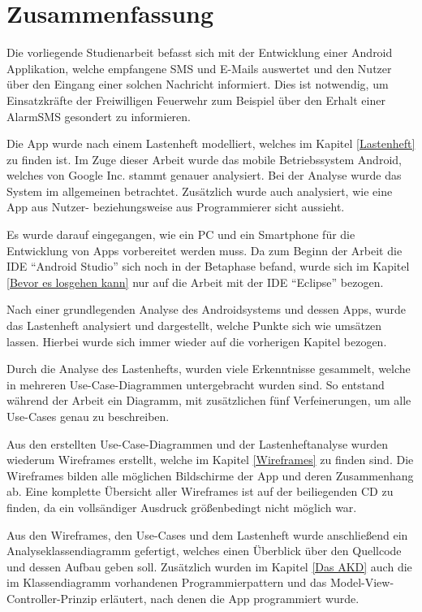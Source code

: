 \section{Zusammenfassung}
Die vorliegende Studienarbeit befasst sich mit der Entwicklung einer Android Applikation, welche empfangene SMS und E-Mails auswertet und den Nutzer \"uber den Eingang einer solchen Nachricht informiert. Dies ist notwendig, um Einsatzkr\"afte der Freiwilligen Feuerwehr zum Beispiel \"uber den Erhalt einer AlarmSMS gesondert zu informieren.

Die App wurde nach einem Lastenheft modelliert, welches im Kapitel \ref{Lastenheft} zu finden ist. Im Zuge dieser Arbeit wurde das mobile Betriebssystem Android, welches von Google Inc. stammt genauer analysiert. Bei der Analyse wurde das System im allgemeinen betrachtet. Zus\"atzlich wurde auch analysiert, wie eine App aus Nutzer- beziehungsweise aus Programmierer sicht aussieht. 

Es wurde darauf eingegangen, wie ein PC und ein Smartphone f\"ur die Entwicklung von Apps vorbereitet werden muss. Da zum Beginn der Arbeit die \ac{IDE} "`Android Studio"' sich noch in der Betaphase befand, wurde sich im Kapitel \ref{Bevor es losgehen kann} nur auf die Arbeit mit der \ac{IDE} "`Eclipse"' bezogen. 

Nach einer grundlegenden Analyse des Androidsystems und dessen Apps, wurde das Lastenheft analysiert und dargestellt, welche Punkte sich wie ums\"atzen lassen. Hierbei wurde sich immer wieder auf die vorherigen Kapitel bezogen.

Durch die Analyse des Lastenhefts, wurden viele Erkenntnisse gesammelt, welche in mehreren Use-Case-Diagrammen untergebracht wurden sind. So entstand w\"ahrend der Arbeit ein Diagramm, mit zus\"atzlichen f\"unf Verfeinerungen, um alle Use-Cases genau zu beschreiben.

Aus den erstellten Use-Case-Diagrammen und der Lastenheftanalyse wurden wiederum Wireframes erstellt, welche im Kapitel \ref{Wireframes} zu finden sind. Die Wireframes bilden alle m\"oglichen Bildschirme der App und deren Zusammenhang ab. Eine komplette \"Ubersicht aller Wireframes ist auf der beiliegenden CD zu finden, da ein volls\"andiger Ausdruck gr\"o\ss{}enbedingt nicht m\"oglich war.

Aus den Wireframes, den Use-Cases und dem Lastenheft wurde anschlie\ss{}end ein Analyseklassendiagramm gefertigt, welches einen \"Uberblick \"uber den Quellcode und dessen Aufbau geben soll. Zus\"atzlich wurden im Kapitel \ref{Das AKD} auch die im Klassendiagramm vorhandenen Programmierpattern und das Model-View-Controller-Prinzip erl\"autert, nach denen die App programmiert wurde.

